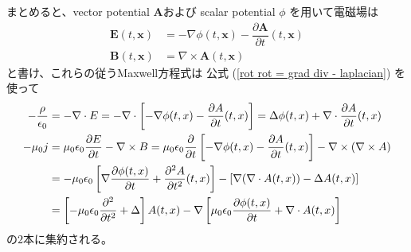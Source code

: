 まとめると、vector potential
$\bm{A}$および
scalar potential $\phi$
を用いて電磁場は
\begin{subequations}
\begin{align}
  \bm{E} (t, \bm{x})
&=
  - \nabla \phi (t, \bm{x})
  - \dfrac{\partial \bm{A}}
    {\partial t} (t, \bm{x})
\\
  \bm{B} (t, \bm{x})
&=
  \nabla \times
  \bm{A} (t, \bm{x})
\end{align}
\label{relation between potential and electric or magnetic field}
\end{subequations}
と書け、これらの従うMaxwell方程式は
公式
(\ref{rot rot = grad div - laplacian})
を使って
\begin{subequations}
\begin{align}
  - \frac{\rho}{\epsilon_0}
&=
  - \nabla \cdot E
=
  - \nabla \cdot
  \left[
    - \nabla \phi (t, x)
    - \dfrac{\partial A}
      {\partial t} (t, x)
  \right]
=
  \Delta \phi (t, x)
  +
    \nabla \cdot
    \dfrac{\partial A}
      {\partial t} (t, x)
\\
  - \mu_0 j
&=
  \mu_0 \epsilon_0
    \frac{\partial E}
      {\partial t}
  -
  \nabla \times B
=
  \mu_0 \epsilon_0
    \frac{\partial}{\partial t}
  \left[
    - \nabla \phi (t, x)
    - \dfrac{\partial A}
      {\partial t} (t, x)
  \right]
  -
  \nabla \times
    (\nabla \times A)
\notag\\&
=
  -
  \mu_0 \epsilon_0
  \left[
    \nabla
    \frac{\partial \phi (t, x)}
      {\partial t}
  +
    \dfrac{\partial^2 A}
      {\partial t^2} (t, x)
  \right]
  -
  \left[
    \nabla
      (\nabla \cdot A (t, x))
  -
    \Delta A (t, x)
  \right]
\notag\\&
=
  \left[
    - \mu_0 \epsilon_0
    \dfrac{\partial^2}{\partial t^2}
  +
    \Delta
  \right]
    A (t, x)
  -
  \nabla
  \left[
    \mu_0 \epsilon_0
    \frac{\partial \phi (t, x)}
      {\partial t}
  +
    \nabla \cdot
      A (t, x)
  \right]
\end{align}
\label{maxwell eq of potentials}
\end{subequations}
の$2$本に集約される。

